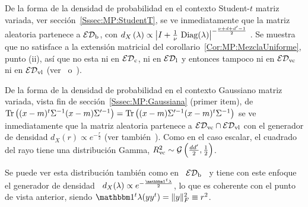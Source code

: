 \begin{ejemplo}\label{Ej:MP:StudentTMatriz}
%
  De la forma  de la densidad de probabilidad en  el contexto Student-$t$ matriz
  variada,  ver secci\'on~\ref{Sssec:MP:StudentT}, se  ve inmediatamente  que la
  matriz  aleatoria  partenece  a  $\mathcal{ED}_{\mathrm{b}}$, con  $d_X\left(  \lambda  \right)
  \propto    \left|   I   +    \frac{1}{\nu}   \,    \operatorname{Diag}(\lambda)   \right|^{-
    \frac{\nu+d+d'-1}{2}}$  .  Se  muestra  que no  satisface  a la  extensi\'on
  matricial del corollario~\ref{Cor:MP:MezclaUniforme}, punto (ii), as\'i que no
  esta ni en  $\mathcal{ED}_{\mathrm{c}}$, ni en $\mathcal{ED}_{\mathrm{l}}$ y entonces  tampoco ni en $\mathcal{ED}_{\mathrm{vc}}$
  ni    en   $\mathcal{ED}_{\mathrm{vl}}$    (ver~\cite[Ej.~1]{FanChe84}    o~\cite[ejemplo   del
  ec.~(2.3)]{Kar81}).
%
\end{ejemplo}

\begin{ejemplo}\label{Ej:MP:GaussianaMatriz}
%
  De la  forma de la  densidad de probabilidad  en el contexto  Gaussiano matriz
  variada,  vista fin  de secci\'on~\ref{Sssec:MP:Gaussiana}  (primer  item), de
  $\operatorname{Tr} \left( (x-m)^t \Sigma^{-1} (x-m)  \Sigma'^{-1} \right) = \operatorname{Tr} \left( (x-m)
    \Sigma'^{-1} (x-m)^t \Sigma^{-1} \right)$ se ve inmediatamente que la matriz
  aleatoria partenece a $\mathcal{ED}_{\mathrm{vc}} \cap  \mathcal{ED}_{\mathrm{vl}}$ con el generador de densidad
  $d_X(r)   \propto  e^{-\frac{r}{2}}$  (ver   tambi\'en~\cite{Daw81,  FanKot90,
    GupNag99}).   Como  en el  caso  escalar, el  cuadrado  del  rayo tiene  una
  distribuci\'on  Gamma,  $R_{\mathrm{vc}}^2  \sim  \mathcal{G}\left( \frac{d  d'}{2}  ,  \frac12
  \right)$.

  Se puede ver esta distribuci\'on tambi\'en  como en \ $\mathcal{ED}_{\mathrm{b}}$ \ y tiene con
  este enfoque el generador  de densidad \ $d_X(\lambda) \propto e^{-\frac{\un^t
      \lambda}{2}}$, lo que es coherente  con el punto de vista anterior, siendo
  $\un^t \lambda(y y^t) = \| y \|_F^2 \equiv r^2$.
\end{ejemplo}

